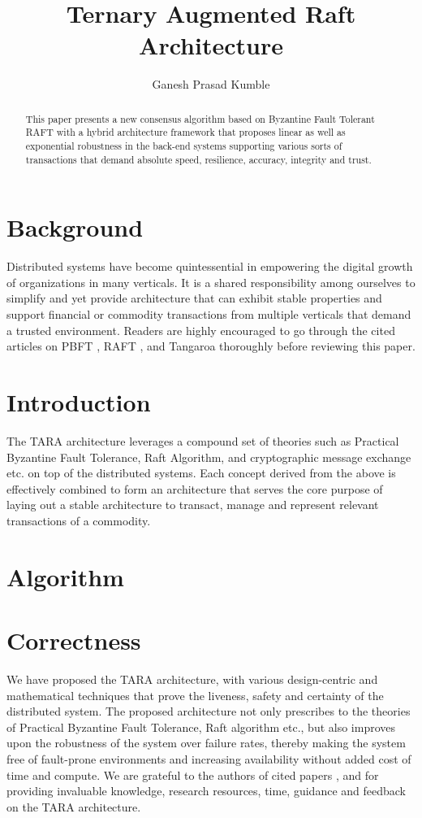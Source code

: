 \documentclass[]{article}
\title{Ternary Augmented Raft Architecture}
\author{Ganesh Prasad Kumble}
\begin{document}
\date{}
\maketitle

\begin{abstract}
This paper presents a new consensus algorithm based on Byzantine Fault Tolerant\cite{ARTICLE:1} RAFT \cite{ARTICLE:2} with a hybrid architecture framework that proposes linear as well as exponential robustness in the back-end systems supporting various sorts of transactions that demand absolute speed, resilience, accuracy, integrity and trust.
\end{abstract}

\section{Background}
Distributed systems have become quintessential in empowering the digital growth of organizations in many verticals. It is a shared responsibility among ourselves to simplify and yet provide architecture that can exhibit stable properties and support financial or commodity transactions from multiple verticals that demand a trusted environment. Readers are highly encouraged to go through the cited articles on PBFT \cite{ARTICLE:1}, RAFT \cite{ARTICLE:2}, and Tangaroa \cite{ARTICLE:3} thoroughly before reviewing this paper.

\section{Introduction}
The TARA architecture leverages a compound set of theories such as Practical Byzantine Fault Tolerance, Raft Algorithm, and cryptographic message exchange etc. on top of the distributed systems. Each concept derived from the above is effectively combined to form an architecture that serves the core purpose of laying out a stable architecture to transact, manage and represent relevant transactions of a commodity.

\section{Algorithm}

\section{Correctness}
We have proposed the TARA architecture, with various design-centric and mathematical techniques that prove the liveness, safety and certainty of the distributed system. The proposed architecture not only prescribes to the theories of Practical Byzantine Fault Tolerance, Raft algorithm etc., but also improves upon the robustness of the system over failure rates, thereby making the system free of fault-prone environments and increasing availability without added cost of time and compute.
We are grateful to the authors of cited papers \cite{ARTICLE:1}, \cite{ARTICLE:2} and \cite{ARTICLE:3} for providing invaluable knowledge, research resources, time, guidance and feedback on the TARA architecture.
\end{document}
